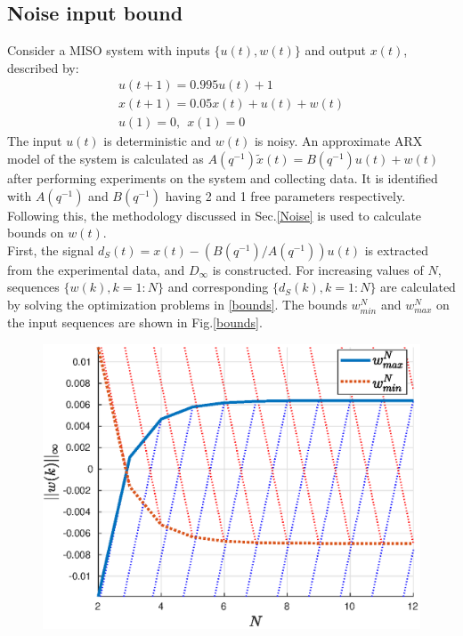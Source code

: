 \documentclass[letterpaper, 10 pt, conference]{ieeeconf}  %
\begin{document}
\begin{enumerate}
	\subsection{Noise input bound}
	Consider a MISO system with inputs $\{u(t),w(t)\}$ and output $x(t)$, described by:
	\begin{equation*}
	\begin{matrix}
	u(t+1) = 0.995u(t)+1 \\
	x(t+1) = 0.05x(t)+u(t)+w(t) \\
	u(1) = 0, \hspace{5pt} x(1) = 0
	\end{matrix}
	\end{equation*}
	The input $u(t)$ is deterministic and $w(t)$ is noisy. An approximate ARX model of the system is calculated as $A(q^{-1})\tilde{x}(t) = B(q^{-1})u(t)+w(t)$ after performing experiments on the system and collecting data. It is identified with $A(q^{-1})$ and $B(q^{-1})$ having 2 and 1 free parameters respectively. Following this, the methodology discussed in Sec.\ref{Noise} is used to calculate bounds on $w(t)$.
	\\
	First, the signal $d_S(t)=x(t) - (B(q^{-1})/A(q^{-1}))u(t)$ is extracted from the experimental data, and $D_{\infty}$ is constructed. For increasing values of $N$, sequences $\{w(k),k=1:N\}$ and corresponding $\{d_S(k),k=1:N\}$ are calculated by solving the optimization problems in \ref{bounds}. The bounds $w^N_{min}$ and $w^N_{max}$ on the input sequences are shown in Fig.\ref{bounds}.
	\begin{figure}[h]
		\includegraphics[scale = 0.55]{bounds.eps}

\end{figure}
\end{enumerate}
\end{document}
